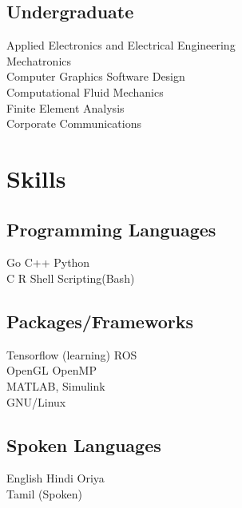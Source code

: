 \documentclass[]{deedy-resume-openfont}
\begin{document}
\begin{minipage}[t]{0.33\textwidth}
\sectionsep{}

\subsection{Undergraduate}
Applied Electronics and Electrical Engineering\\
Mechatronics \\
Computer Graphics Software Design \\
Computational Fluid Mechanics\\
Finite Element Analysis\\
Corporate Communications\\
\sectionsep


\section{Skills}

\subsection{Programming Languages}

Go \textbullet{} C++ \textbullet{} Python \\
C \textbullet{} R \textbullet{} Shell Scripting(Bash)

\sectionsep

\subsection{Packages/Frameworks}

Tensorflow (learning) \textbullet{} ROS\\
OpenGL \textbullet{} OpenMP \\
MATLAB, Simulink \\
GNU/Linux 

\sectionsep

\subsection{Spoken Languages}
English \textbullet{} Hindi \textbullet{} Oriya \\
Tamil (Spoken)

%
%

\end{minipage} 
\end{document}
